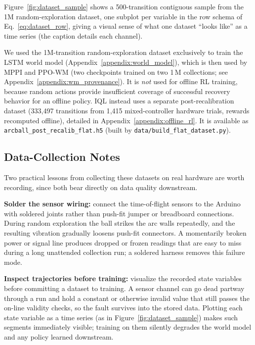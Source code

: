 Figure~\ref{fig:dataset_sample} shows a 500-transition contiguous
sample from the 1M random-exploration dataset, one subplot per variable
in the row schema of Eq.~\ref{eq:dataset_row}, giving a visual sense of
what one dataset ``looks like'' as a time series (the caption details
each channel).

We used the 1M-transition random-exploration dataset
exclusively to train the LSTM world model
(Appendix~\ref{appendix:world_model}),
which is then used by MPPI and PPO-WM (two checkpoints trained on
two 1\,M collections; see Appendix~\ref{appendix:wm_provenance}). It is \emph{not} used
for offline RL training, because random actions provide insufficient
coverage of successful recovery behavior for an offline policy.
IQL instead uses a separate post-recalibration dataset (333{,}497
transitions from 1{,}415 mixed-controller hardware trials, rewards
recomputed offline), detailed in Appendix~\ref{appendix:offline_rl}. It
is available as \texttt{arcball\_post\_recalib\_flat.h5} (built by
\texttt{data/build\_flat\_dataset.py}).

\subsection{Data-Collection Notes}
\label{appendix:dataset_notes}

Two practical lessons from collecting these datasets on real hardware are
worth recording, since both bear directly on data quality downstream.

\textbf{Solder the sensor wiring:} connect the time-of-flight sensors to the
Arduino with soldered joints rather than push-fit jumper or breadboard
connections. During random exploration the ball strikes the arc walls
repeatedly, and the resulting vibration gradually loosens push-fit
connectors. A momentarily broken power or signal line produces dropped or
frozen readings that are easy to miss during a long unattended collection
run; a soldered harness removes this failure mode.

\textbf{Inspect trajectories before training:} visualize the recorded state
variables before committing a dataset to training. A sensor channel can go
dead partway through a run and hold a constant or otherwise invalid value
that still passes the on-line validity checks, so the fault survives into
the stored data. Plotting each state variable as a time series (as in
Figure~\ref{fig:dataset_sample}) makes such segments immediately visible;
training on them silently degrades the world model and any policy learned
downstream.
